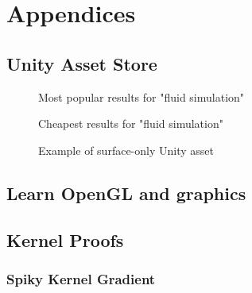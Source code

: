 \documentclass[12pt]{article}
\newcommand{\wideimage}[2][]{%
  \makebox[\textwidth][c]{\texttt{[image: \#2]}}%
}
\begin{document}
    \newpage

    \section{Appendices}
    \label{sec:appendices}

    \subsection{Unity Asset Store}

    \begin{figure}[H]
        \wideimage[]{unityStore1.png}
        \caption{Most popular results for "fluid simulation" \cite{unityasset}}
    \end{figure}

    \begin{figure}[H]
        \wideimage[]{unityStore2.png}
        \caption{Cheapest results for "fluid simulation" \cite{unityasset}}
    \end{figure}

    \begin{figure}[H]
        \wideimage[]{stylizedWaterURP.png}
        \caption{Example of surface-only Unity asset \cite{stylized}}
    \end{figure}

    \subsection{Learn OpenGL and graphics}

    \subsection{Kernel Proofs}

    \subsubsection{Spiky Kernel Gradient}
\end{document}
